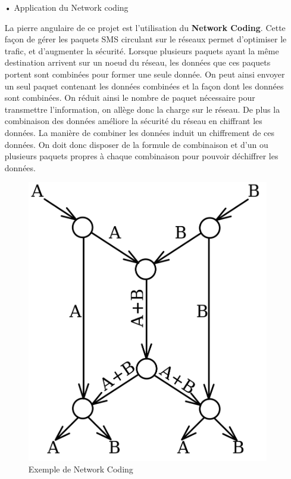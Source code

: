 \documentclass[a4paper, 12pt]{article}
\begin{document}
\begin{itemize}
\item [•]{Application du Network coding}
            
            La pierre angulaire de ce projet est l'utilisation du \textbf{Network Coding}. Cette façon de gérer les paquets SMS circulant sur le réseaux permet d'optimiser le trafic, et d'augmenter la sécurité.
            Lorsque plusieurs paquets ayant la même destination arrivent sur un noeud du réseau, les données que ces paquets portent sont combinées pour former une seule donnée. On peut ainsi envoyer un seul paquet contenant les données combinées et la façon dont les données sont combinées.
            On réduit ainsi le nombre de paquet nécessaire pour transmettre l'information, on allège donc la charge sur le réseau.
            De plus la combinaison des données améliore la sécurité du réseau en chiffrant les données. La manière de combiner les données induit un chiffrement de ces données. On doit donc disposer de la formule de combinaison et d'un ou plusieurs paquets propres à chaque combinaison pour pouvoir déchiffrer les données.
            
            \begin{figure}[H]
                \centering
                \includegraphics[scale=0.15]{images/Butterfly_network.svg.png}
                \caption{Exemple de Network Coding}
                \label{fig:exemple_Network_Coding}
            \end{figure}
            

\end{itemize}
\end{document}

